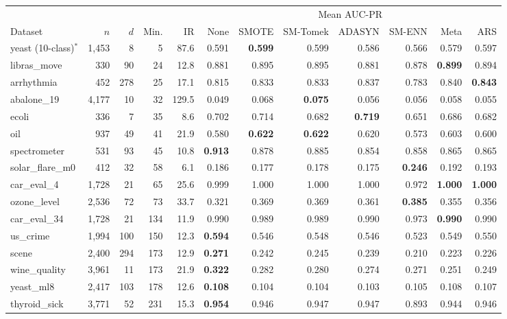\begin{tabular}{lrrrrrrrrrrr}
\toprule
 & & & & & \multicolumn{7}{c}{Mean AUC-PR} \\
\cmidrule(l){6-12}
Dataset & $n$ & $d$ & Min. & IR & None & SMOTE & SM-Tomek & ADASYN & SM-ENN & Meta & ARS \\
\midrule
yeast (10-class)$^\ast$ & 1,453 & 8 & 5 & 87.6 & 0.591 & \textbf{0.599} & 0.599 & 0.586 & 0.566 & 0.579 & 0.597 \\
libras\_move & 330 & 90 & 24 & 12.8 & 0.881 & 0.895 & 0.895 & 0.881 & 0.878 & \textbf{0.899} & 0.894 \\
arrhythmia & 452 & 278 & 25 & 17.1 & 0.815 & 0.833 & 0.833 & 0.837 & 0.783 & 0.840 & \textbf{0.843} \\
abalone\_19 & 4,177 & 10 & 32 & 129.5 & 0.049 & 0.068 & \textbf{0.075} & 0.056 & 0.056 & 0.058 & 0.055 \\
ecoli & 336 & 7 & 35 & 8.6 & 0.702 & 0.714 & 0.682 & \textbf{0.719} & 0.651 & 0.686 & 0.682 \\
oil & 937 & 49 & 41 & 21.9 & 0.580 & \textbf{0.622} & \textbf{0.622} & 0.620 & 0.573 & 0.603 & 0.600 \\
spectrometer & 531 & 93 & 45 & 10.8 & \textbf{0.913} & 0.878 & 0.885 & 0.854 & 0.858 & 0.865 & 0.865 \\
solar\_flare\_m0 & 412 & 32 & 58 & 6.1 & 0.186 & 0.177 & 0.178 & 0.175 & \textbf{0.246} & 0.192 & 0.193 \\
car\_eval\_4 & 1,728 & 21 & 65 & 25.6 & 0.999 & 1.000 & 1.000 & 1.000 & 0.972 & \textbf{1.000} & \textbf{1.000} \\
ozone\_level & 2,536 & 72 & 73 & 33.7 & 0.321 & 0.369 & 0.369 & 0.361 & \textbf{0.385} & 0.355 & 0.356 \\
car\_eval\_34 & 1,728 & 21 & 134 & 11.9 & 0.990 & 0.989 & 0.989 & 0.990 & 0.973 & \textbf{0.990} & 0.990 \\
us\_crime & 1,994 & 100 & 150 & 12.3 & \textbf{0.594} & 0.546 & 0.548 & 0.546 & 0.523 & 0.549 & 0.550 \\
scene & 2,400 & 294 & 173 & 12.9 & \textbf{0.271} & 0.242 & 0.245 & 0.239 & 0.210 & 0.223 & 0.226 \\
wine\_quality & 3,961 & 11 & 173 & 21.9 & \textbf{0.322} & 0.282 & 0.280 & 0.274 & 0.271 & 0.251 & 0.249 \\
yeast\_ml8 & 2,417 & 103 & 178 & 12.6 & \textbf{0.108} & 0.104 & 0.104 & 0.103 & 0.105 & 0.108 & 0.107 \\
thyroid\_sick & 3,771 & 52 & 231 & 15.3 & \textbf{0.954} & 0.946 & 0.947 & 0.947 & 0.893 & 0.944 & 0.946 \\

\end{tabular}
